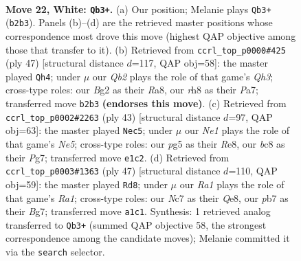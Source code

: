 \documentclass[11pt]{article}
\begin{document}
\clearpage

\begin{figure}[p]\centering
\begin{subfigure}{0.46\textwidth}\centering
\resizebox{\linewidth}{!}{%
\newchessgame
\chessboard[
  setfen={r1b4r/1pN2k2/1n6/2b3pp/1n5q/3PpP2/PQ4B1/R3NRK1 w - - 0 22},
  showmover=false,
  pgfstyle=straightmove, color=movearrow, markmove={b2-b3}
]}
\caption{}
\end{subfigure}\hfill
\begin{subfigure}{0.46\textwidth}\centering
\resizebox{\linewidth}{!}{%
\newchessgame
\chessboard[
  setfen={r4r1k/pp3p1p/2npb2q/3N2N1/2BP2n1/8/PPPQ2R1/R5K1 b - - 10 24},
  showmover=false,
  pgfstyle=straightmove, color=movearrow, markmove={h6-h4}
]}
\caption{}
\end{subfigure}
\\[4pt]
\begin{subfigure}{0.46\textwidth}\centering
\resizebox{\linewidth}{!}{%
\newchessgame
\chessboard[
  setfen={r3r1k1/2qn1pp1/p2p1b1p/3P4/2N1n3/3BB3/1PP3PP/R2Q1R1K b - - 4 22},
  showmover=false,
  pgfstyle=straightmove, color=movearrow, markmove={e4-c5}
]}
\caption{}
\end{subfigure}\hfill
\begin{subfigure}{0.46\textwidth}\centering
\resizebox{\linewidth}{!}{%
\newchessgame
\chessboard[
  setfen={r3qrk1/p4pbp/6p1/3N3n/R4p2/1BP2Q2/P5PP/1K5R b - - 0 24},
  showmover=false,
  pgfstyle=straightmove, color=movearrow, markmove={a8-d8}
]}
\caption{}
\end{subfigure}
\caption{\textbf{Move 22, White: \texttt{Qb3+}.} (a) Our position; Melanie plays \texttt{Qb3+} (\texttt{b2b3}). Panels (b)--(d) are the retrieved master positions whose correspondence most drove this move (highest QAP objective among those that transfer to it). (b) Retrieved from \texttt{ccrl\_top\_p0000\#425} (ply 47) [structural distance $d$=117, QAP obj=58]: the master played \texttt{Qh4}; under $\mu$ our \emph{Qb2} plays the role of that game's \emph{Qh3}; cross-type roles: our \emph{B}g2 as their \emph{R}a8, our \emph{r}h8 as their \emph{P}a7; transferred move \texttt{b2b3} \textbf{(endorses this move)}. (c) Retrieved from \texttt{ccrl\_top\_p0002\#2263} (ply 43) [structural distance $d$=97, QAP obj=63]: the master played \texttt{Nec5}; under $\mu$ our \emph{Ne1} plays the role of that game's \emph{Ne5}; cross-type roles: our \emph{p}g5 as their \emph{R}e8, our \emph{b}c8 as their \emph{P}g7; transferred move \texttt{e1c2}. (d) Retrieved from \texttt{ccrl\_top\_p0003\#1363} (ply 47) [structural distance $d$=110, QAP obj=59]: the master played \texttt{Rd8}; under $\mu$ our \emph{Ra1} plays the role of that game's \emph{Ra1}; cross-type roles: our \emph{N}c7 as their \emph{Q}e8, our \emph{p}b7 as their \emph{B}g7; transferred move \texttt{a1c1}. Synthesis: 1 retrieved analog transferred to \texttt{Qb3+} (summed QAP objective 58, the strongest correspondence among the candidate moves); Melanie committed it via the \texttt{search} selector.}
\label{fig:thought-m42}
\end{figure}
\end{document}
